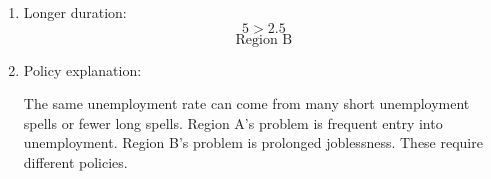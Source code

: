 \documentclass[12pt]{article}
\begin{document}
\begin{enumerate}
\begin{enumerate}[label=(\alph*)]
    \item Longer duration:
    \[
    5>2.5
    \]
    \[
    \boxed{\text{Region B}}
    \]

    \item Policy explanation:

    The same unemployment rate can come from many short unemployment spells or fewer long spells. Region A's problem is frequent entry into unemployment. Region B's problem is prolonged joblessness. These require different policies.
\end{enumerate}



\end{enumerate}
\end{document}
